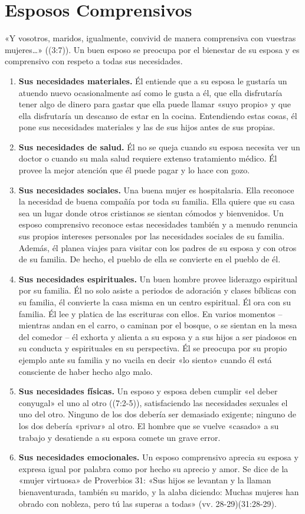 \documentclass[12pt, twoside, openright]{book}
\begin{document}
\section{Esposos Comprensivos}
«Y vosotros, maridos, igualmente, convivid de manera comprensiva con vuestras mujeres…» ((3:7)). 
Un buen esposo se preocupa por el bienestar de su esposa y es comprensivo con respeto a todas sus necesidades. 
\begin{enumerate}
\item \textbf{Sus necesidades materiales.} Él entiende que a su esposa le gustaría un atuendo nuevo ocasionalmente así como le gusta a él, que ella disfrutaría tener algo de dinero para gastar que ella puede llamar «suyo propio» y que ella disfrutaría un descanso de estar en la cocina. Entendiendo estas cosas, él pone sus necesidades materiales y las de sus hijos antes de sus propias. 
\item \textbf{Sus necesidades de salud.} Él no se queja cuando su esposa necesita ver un doctor o cuando su mala salud requiere extenso tratamiento médico. Él provee la mejor atención que él puede pagar y lo hace con gozo. 
\item \textbf{Sus necesidades sociales.} Una buena mujer es hospitalaria. Ella reconoce la necesidad de buena compañía por toda su familia. Ella quiere que su casa sea un lugar donde otros cristianos se sientan cómodos y bienvenidos. Un esposo comprensivo reconoce estas necesidades también y a menudo renuncia sus propios intereses personales por las necesidades sociales de su familia. Además, él planea viajes para visitar con los padres de su esposa y con otros de su familia. De hecho, el pueblo de ella se convierte en el pueblo de él.
\item \textbf{Sus necesidades espirituales.} Un buen hombre provee liderazgo espiritual por su familia. Él no solo asiste a periodos de adoración y clases bíblicas con su familia, él convierte la casa misma en un centro espiritual. Él ora con su familia. Él lee y platica de las escrituras con ellos. En varios momentos – mientras andan en el carro, o caminan por el bosque, o se sientan en la mesa del comedor – él exhorta y alienta a su esposa y a sus hijos a ser piadosos en su conducta y espirituales en su perspectiva. Él se preocupa por su propio ejemplo ante su familia y no vacila en decir «lo siento» cuando él está consciente de haber hecho algo malo.
\item \textbf{Sus necesidades físicas.} Un esposo y esposa deben cumplir «el deber conyugal» el uno al otro ((7:2-5)), satisfaciendo las necesidades sexuales el uno del otro. Ninguno de los dos debería ser demasiado exigente; ninguno de los dos debería «privar» al otro. El hombre que se vuelve «casado» a su trabajo y desatiende a su esposa comete un grave error.
\item \textbf{Sus necesidades emocionales.} Un esposo comprensivo aprecia su esposa y expresa igual por palabra como por hecho su aprecio y amor. Se dice de la «mujer virtuosa» de Proverbios 31: «Sus hijos se levantan y la llaman bienaventurada, también su marido, y la alaba diciendo: Muchas mujeres han obrado con nobleza, pero tú las superas a todas» (vv. 28-29)(31:28-29).
\end{enumerate}
\end{document}
